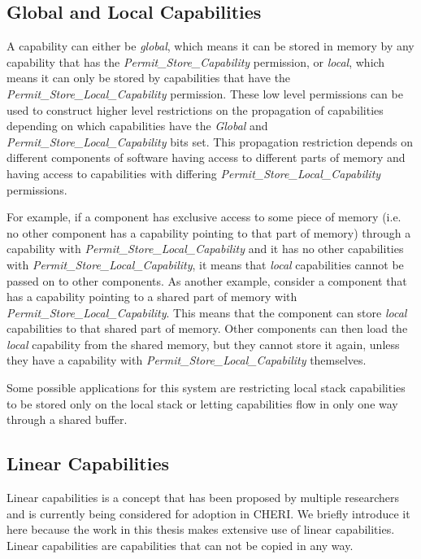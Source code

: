 \subsection{Global and Local Capabilities}
\label{sec:global}
A capability can either be \textit{global}, which means it can be stored in memory by any capability that has the \textit{Permit\_Store\_Capability} permission, or \textit{local}, which means it can only be stored by capabilities that have the \textit{Permit\_Store\_Local\_Capability} permission. These low level permissions can be used to construct higher level restrictions on the propagation of capabilities depending on which capabilities have the \textit{Global} and \textit{Permit\_Store\_Local\_Capability} bits set. This propagation restriction depends on different components of software having access to different parts of memory and having access to capabilities with differing \textit{Permit\_Store\_Local\_Capability} permissions.

For example, if a component has exclusive access to some piece of memory (i.e. no other component has a capability pointing to that part of memory) through a capability with \textit{Permit\_Store\_Local\_Capability} and it has no other capabilities with \textit{Permit\_Store\_Local\_Capability}, it means that \textit{local} capabilities cannot be passed on to other components. As another example, consider a component that has a capability pointing to a shared part of memory with \textit{Permit\_Store\_Local\_Capability}. This means that the component can store \textit{local} capabilities to that shared part of memory. Other components can then load the \textit{local} capability from the shared memory, but they cannot store it again, unless they have a capability with \textit{Permit\_Store\_Local\_Capability} themselves.

Some possible applications for this system are restricting local stack capabilities to be stored only on the local stack or letting capabilities flow in only one way through a shared buffer.\cite{UCAM-CL-TR-951} %

\subsection{Linear Capabilities}
Linear capabilities is a concept that has been proposed by multiple researchers and is currently being considered for adoption in CHERI. We briefly introduce it here because the work in this thesis makes extensive use of linear capabilities. Linear capabilities are capabilities that can not be copied in any way.

